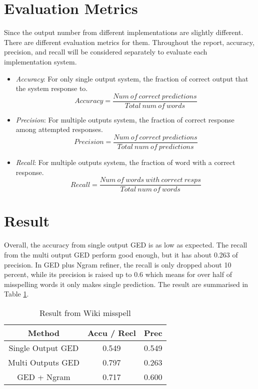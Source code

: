 \documentclass[11pt]{article}
\begin{document}
\section{Evaluation Metrics}
Since the output number from different implementations are slightly different. There are different evaluation metrics for them. Throughout the report, accuracy, precision, and recall will be considered separately to evaluate each implementation system.
\begin{itemize}
\item \emph{Accuracy}: For only single output system, the fraction of correct output that the system response to.
\[Accuracy = \frac{Num\ of\ correct\ predictions}{Total\ num\ of\ words}\]
\item \emph{Precision}: For multiple outputs system, the fraction of correct response among attempted responses.
\[Precision = \frac{Num\ of\ correct\ predictions}{Total\ num\ of\ predictions}\]
\item \emph{Recall}: For multiple outputs system, the fraction of word with a correct response.
\[Recall = \frac{Num\ of\ words\ with\ correct\ resps}{Total\ num\ of\ words}\]
\end{itemize}

\section{Result}
Overall, the accuracy from single output GED is as low as expected. The recall from the multi output GED perform good enough, but it has about 0.263 of precision. In GED plus Ngram refiner, the recall is only dropped about 10 percent, while its precision is raised up to 0.6 which means for over half of misspelling words it only makes single prediction. The result are summarised in Table \ref{table1}.

\begin{table}[h]
\begin{center}
\begin{tabular}{|c|c|c|}

    \hline
    Method & Accu / Recl & Prec\\
    \hline
  
    Single Output GED & 0.549 & 0.549\\
	 \hline    
    Multi Outputs GED & 0.797 & 0.263\\
    \hline
    GED + Ngram & 0.717 & 0.600\\
    \hline
\end{tabular}
\caption{Result from Wiki misspell}
\label{table1}
\end{center}
\end{table}
\end{document}
